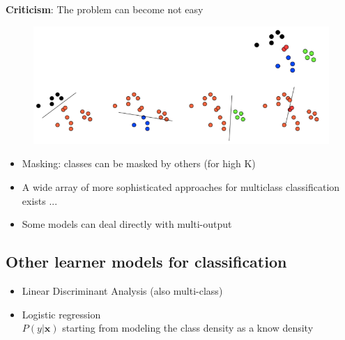 \documentclass[../main.tex]{subfiles}
\begin{document}
\noindent \textbf{Criticism}:
The problem can become not easy
\begin{figure}[H]
    \centering
    \includegraphics[scale = 0.35]{lectures/2_linear_model/2_multiclass_crit.png}
\end{figure}

\begin{itemize}
    \item Masking: classes can be masked by others (for high K) 
    \item A wide array of more sophisticated approaches for
multiclass classification exists ...
    \item Some models can deal directly with multi-output
\end{itemize}

\subsection{Other learner models for classification}
\begin{itemize}
    \item Linear Discriminant Analysis (also multi-class)
    \item Logistic regression\\
    $P(y | \mathbf{x})$  starting from modeling the class density as a know density
\end{itemize}
\end{document}
